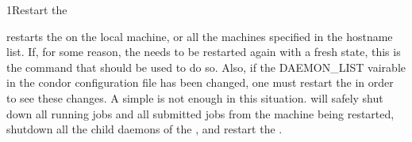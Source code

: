 \begin{ManPage}{}{1}{Restart the }
\label{man-condor-restart}
\Synopsis {}

\Description 

 restarts the  on the local machine, or all the
machines specified in the hostname list.  If, for some reason, the
 needs to be restarted again with a fresh state, this is the
command that should be used to do so.  Also, if the DAEMON\_LIST vairable in
the condor configuration file has been changed, one must restart the
 in order to see these changes.  A simple 
is not enough in this situation.   will safely shut down
all running jobs and all submitted jobs from the machine being restarted,
shutdown all the child daemons of the , and restart the
.

\begin{Options}
\end{Options}

\end{ManPage}

